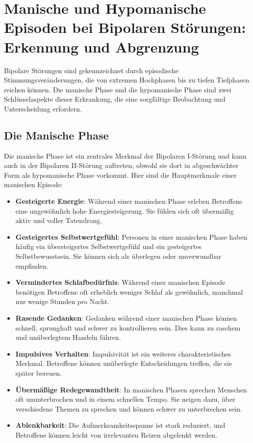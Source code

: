 
\section{Manische und Hypomanische Episoden bei Bipolaren Störungen: Erkennung und Abgrenzung}

Bipolare Störungen sind gekennzeichnet durch episodische Stimmungsveränderungen, die von extremen Hochphasen bis zu tiefen Tiefphasen reichen können. Die manische Phase und die hypomanische Phase sind zwei Schlüsselaspekte dieser Erkrankung, die eine sorgfältige Beobachtung und Unterscheidung erfordern.

\subsection{Die Manische Phase}

Die manische Phase ist ein zentrales Merkmal der Bipolaren I-Störung und kann auch in der Bipolaren II-Störung auftreten, obwohl sie dort in abgeschwächter Form als hypomanische Phase vorkommt. Hier sind die Hauptmerkmale einer manischen Episode:

\begin{itemize}
  \item \textbf{Gesteigerte Energie}: Während einer manischen Phase erleben Betroffene eine ungewöhnlich hohe Energiesteigerung. Sie fühlen sich oft übermäßig aktiv und voller Tatendrang.
  
  \item \textbf{Gesteigertes Selbstwertgefühl}: Personen in einer manischen Phase haben häufig ein übersteigertes Selbstwertgefühl und ein gesteigertes Selbstbewusstsein. Sie können sich als überlegen oder unverwundbar empfinden.
  
  \item \textbf{Vermindertes Schlafbedürfnis}: Während einer manischen Episode benötigen Betroffene oft erheblich weniger Schlaf als gewöhnlich, manchmal nur wenige Stunden pro Nacht.
  
  \item \textbf{Rasende Gedanken}: Gedanken während einer manischen Phase können schnell, sprunghaft und schwer zu kontrollieren sein. Dies kann zu raschem und unüberlegtem Handeln führen.
  
  \item \textbf{Impulsives Verhalten}: Impulsivität ist ein weiteres charakteristisches Merkmal. Betroffene können unüberlegte Entscheidungen treffen, die sie später bereuen.
  
  \item \textbf{Übermäßige Redegewandtheit}: In manischen Phasen sprechen Menschen oft ununterbrochen und in einem schnellen Tempo. Sie neigen dazu, über verschiedene Themen zu sprechen und können schwer zu unterbrechen sein.
  
  \item \textbf{Ablenkbarkeit}: Die Aufmerksamkeitsspanne ist stark reduziert, und Betroffene können leicht von irrelevanten Reizen abgelenkt werden.
\end{itemize}

